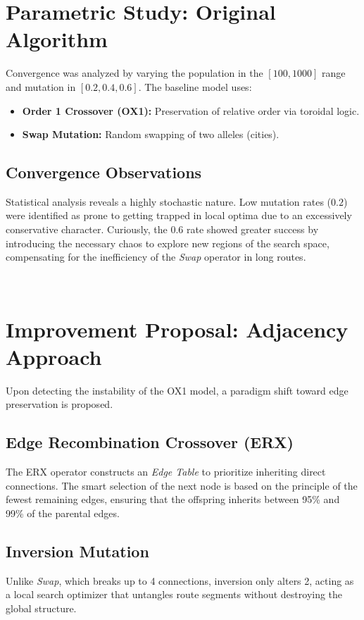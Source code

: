 \documentclass[11pt,a4paper]{article}
\begin{document}
\section{Parametric Study: Original Algorithm}
Convergence was analyzed by varying the population in the $[100, 1000]$ range and mutation in $[0.2, 0.4, 0.6]$. The baseline model uses:
\begin{itemize}
    \item \textbf{Order 1 Crossover (OX1):} Preservation of relative order via toroidal logic.
    \item \textbf{Swap Mutation:} Random swapping of two alleles (cities).
\end{itemize}

\subsection{Convergence Observations}
Statistical analysis reveals a highly stochastic nature. Low mutation rates ($0.2$) were identified as prone to getting trapped in local optima due to an excessively conservative character. Curiously, the $0.6$ rate showed greater success by introducing the necessary chaos to explore new regions of the search space, compensating for the inefficiency of the \textit{Swap} operator in long routes.

 \\

\section{Improvement Proposal: Adjacency Approach}
Upon detecting the instability of the OX1 model, a paradigm shift toward edge preservation is proposed.

\subsection{Edge Recombination Crossover (ERX)}
The ERX operator constructs an \textit{Edge Table} to prioritize inheriting direct connections. The smart selection of the next node is based on the principle of the fewest remaining edges, ensuring that the offspring inherits between 95\% and 99\% of the parental edges.

\subsection{Inversion Mutation}
Unlike \textit{Swap}, which breaks up to 4 connections, inversion only alters 2, acting as a local search optimizer that untangles route segments without destroying the global structure.
\end{document}

